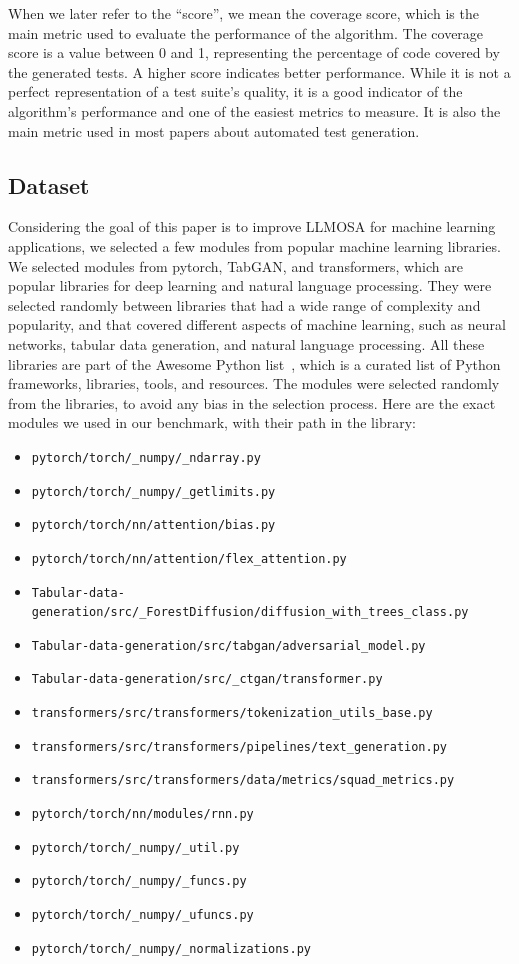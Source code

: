 \documentclass{article}
\begin{document}
When we later refer to the ``score'', we mean the coverage score, which is the main metric used to evaluate the performance of the algorithm. The coverage score is a value between 0 and 1, representing the percentage of code covered by the generated tests. A higher score indicates better performance.
While it is not a perfect representation of a test suite's quality, it is a good indicator of the algorithm's performance and one of the easiest metrics to measure. It is also the main metric used in most papers about automated test generation.

\subsection{Dataset}
Considering the goal of this paper is to improve LLMOSA for machine learning applications, we selected a few modules from popular machine learning libraries.
We selected modules from pytorch, TabGAN, and transformers, which are popular libraries for deep learning and natural language processing.
They were selected randomly between libraries that had a wide range of complexity and popularity, and that covered different aspects of machine learning, such as neural networks, tabular data generation, and natural language processing.
All these libraries are part of the Awesome Python list~\cite{Awesome_Python}, which is a curated list of Python frameworks, libraries, tools, and resources.
The modules were selected randomly from the libraries, to avoid any bias in the selection process.
Here are the exact modules we used in our benchmark, with their path in the library:
\begin{itemize}
    \item \texttt{pytorch/torch/\_numpy/\_ndarray.py}
    \item \texttt{pytorch/torch/\_numpy/\_getlimits.py}
    \item \texttt{pytorch/torch/nn/attention/bias.py}
    \item \texttt{pytorch/torch/nn/attention/flex\_attention.py}
    \item \texttt{Tabular-data-generation/src/\_ForestDiffusion/diffusion\_with\_trees\_class.py}
    \item \texttt{Tabular-data-generation/src/tabgan/adversarial\_model.py}
    \item \texttt{Tabular-data-generation/src/\_ctgan/transformer.py}
    \item \texttt{transformers/src/transformers/tokenization\_utils\_base.py}
    \item \texttt{transformers/src/transformers/pipelines/text\_generation.py}
    \item \texttt{transformers/src/transformers/data/metrics/squad\_metrics.py}
    \item \texttt{pytorch/torch/nn/modules/rnn.py}
    \item \texttt{pytorch/torch/\_numpy/\_util.py}
    \item \texttt{pytorch/torch/\_numpy/\_funcs.py}
    \item \texttt{pytorch/torch/\_numpy/\_ufuncs.py}
    \item \texttt{pytorch/torch/\_numpy/\_normalizations.py}
\end{itemize}
\end{document}
